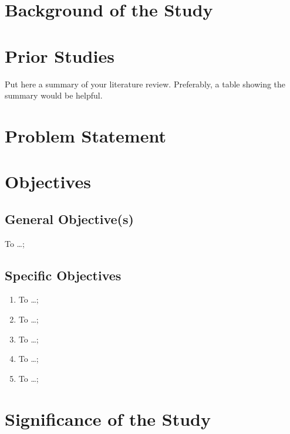 \section{Background of the Study}

\Blindtext


\section{Prior Studies}

Put here a summary of your literature review.  Preferably, a table showing the summary would be helpful. \blindtext



\section{Problem Statement}
\blindtext



\section{Objectives}
\subsection{General Objective(s)}
To \ldots;

\subsection{Specific Objectives}

\begin{enumerate}
	\item To  \ldots;
	
	\item To  \ldots;
	
	\item To  \ldots;
	
	\item To  \ldots;
	
	\item To  \ldots;
\end{enumerate}



\section{Significance of the Study}

\blindtext



